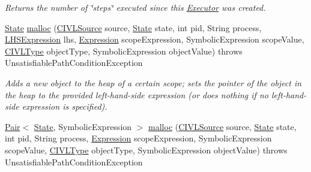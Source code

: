 \begin{DoxyCompactItemize}
\begin{DoxyCompactList}\small\item\em Returns the number of \char`\"{}steps\char`\"{} executed since this \hyperlink{interfaceedu_1_1udel_1_1cis_1_1vsl_1_1civl_1_1semantics_1_1IF_1_1Executor}{Executor} was created. \end{DoxyCompactList}\item 
\hyperlink{interfaceedu_1_1udel_1_1cis_1_1vsl_1_1civl_1_1state_1_1IF_1_1State}{State} \hyperlink{interfaceedu_1_1udel_1_1cis_1_1vsl_1_1civl_1_1semantics_1_1IF_1_1Executor_aa866838dc60d17311c93164033fd0900}{malloc} (\hyperlink{interfaceedu_1_1udel_1_1cis_1_1vsl_1_1civl_1_1model_1_1IF_1_1CIVLSource}{C\+I\+V\+L\+Source} source, \hyperlink{interfaceedu_1_1udel_1_1cis_1_1vsl_1_1civl_1_1state_1_1IF_1_1State}{State} state, int pid, String process, \hyperlink{interfaceedu_1_1udel_1_1cis_1_1vsl_1_1civl_1_1model_1_1IF_1_1expression_1_1LHSExpression}{L\+H\+S\+Expression} lhs, \hyperlink{interfaceedu_1_1udel_1_1cis_1_1vsl_1_1civl_1_1model_1_1IF_1_1expression_1_1Expression}{Expression} scope\+Expression, Symbolic\+Expression scope\+Value, \hyperlink{interfaceedu_1_1udel_1_1cis_1_1vsl_1_1civl_1_1model_1_1IF_1_1type_1_1CIVLType}{C\+I\+V\+L\+Type} object\+Type, Symbolic\+Expression object\+Value)  throws Unsatisfiable\+Path\+Condition\+Exception
\begin{DoxyCompactList}\small\item\em Adds a new object to the heap of a certain scope; sets the pointer of the object in the heap to the provided left-\/hand-\/side expression (or does nothing if no left-\/hand-\/side expression is specified). \end{DoxyCompactList}\item 
\hyperlink{classedu_1_1udel_1_1cis_1_1vsl_1_1civl_1_1util_1_1IF_1_1Pair}{Pair}$<$ \hyperlink{interfaceedu_1_1udel_1_1cis_1_1vsl_1_1civl_1_1state_1_1IF_1_1State}{State}, Symbolic\+Expression $>$ \hyperlink{interfaceedu_1_1udel_1_1cis_1_1vsl_1_1civl_1_1semantics_1_1IF_1_1Executor_a4775347def35617040b08fa1a47761d9}{malloc} (\hyperlink{interfaceedu_1_1udel_1_1cis_1_1vsl_1_1civl_1_1model_1_1IF_1_1CIVLSource}{C\+I\+V\+L\+Source} source, \hyperlink{interfaceedu_1_1udel_1_1cis_1_1vsl_1_1civl_1_1state_1_1IF_1_1State}{State} state, int pid, String process, \hyperlink{interfaceedu_1_1udel_1_1cis_1_1vsl_1_1civl_1_1model_1_1IF_1_1expression_1_1Expression}{Expression} scope\+Expression, Symbolic\+Expression scope\+Value, \hyperlink{interfaceedu_1_1udel_1_1cis_1_1vsl_1_1civl_1_1model_1_1IF_1_1type_1_1CIVLType}{C\+I\+V\+L\+Type} object\+Type, Symbolic\+Expression object\+Value)  throws Unsatisfiable\+Path\+Condition\+Exception

\end{DoxyCompactItemize}
